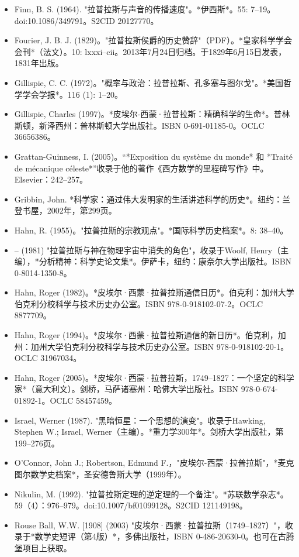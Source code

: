 \begin{itemize}
\item Finn, B. S. (1964). "拉普拉斯与声音的传播速度"。*伊西斯*。55: 7–19。doi:10.1086/349791。S2CID 20127770。  
\item Fourier, J. B. J. (1829)。"拉普拉斯侯爵的历史赞辞"（PDF）。*皇家科学学会会刊*（法文）。10: lxxxi–cii。2013年7月24日归档。于1829年6月15日发表，1831年出版。  
\item Gillispie, C. C. (1972)。"概率与政治：拉普拉斯、孔多塞与图尔戈"。*美国哲学学会学报*。116 (1): 1–20。  
\item Gillispie, Charles (1997)。*皮埃尔-西蒙·拉普拉斯：精确科学的生命*。普林斯顿，新泽西州：普林斯顿大学出版社。ISBN 0-691-01185-0。OCLC 36656386。  
\item Grattan-Guinness, I. (2005)。“*Exposition du système du monde* 和 *Traité de mécanique céleste*”收录于他的著作《西方数学的里程碑写作》中。Elsevier：242–257。  
\item Gribbin, John. *科学家：通过伟大发明家的生活讲述科学的历史*。纽约：兰登书屋，2002年，第299页。  
\item Hahn, R. (1955)。"拉普拉斯的宗教观点"。*国际科学历史档案*。8: 38–40。  
\item – (1981) "拉普拉斯与神在物理宇宙中消失的角色"，收录于Woolf, Henry（主编），*分析精神：科学史论文集*。伊萨卡，纽约：康奈尔大学出版社。ISBN 0-8014-1350-8。  
\item Hahn, Roger (1982)。*皮埃尔·西蒙·拉普拉斯通信日历*。伯克利：加州大学伯克利分校科学与技术历史办公室。ISBN 978-0-918102-07-2。OCLC 8877709。  
\item Hahn, Roger (1994)。*皮埃尔·西蒙·拉普拉斯通信的新日历*。伯克利，加州：加州大学伯克利分校科学与技术历史办公室。ISBN 978-0-918102-20-1。OCLC 31967034。  
\item Hahn, Roger (2005)。*皮埃尔·西蒙·拉普拉斯，1749–1827：一个坚定的科学家*（意大利文）。剑桥，马萨诸塞州：哈佛大学出版社。ISBN 978-0-674-01892-1。OCLC 58457459。
\item Israel, Werner (1987). "黑暗恒星：一个思想的演变"。收录于Hawking, Stephen W.; Israel, Werner（主编）。*重力学300年*。剑桥大学出版社，第199–276页。  
\item O'Connor, John J.; Robertson, Edmund F.，"皮埃尔-西蒙·拉普拉斯"，*麦克图尔数学史档案*，圣安德鲁斯大学（1999年）。  
\item Nikulin, M. (1992). "拉普拉斯定理的逆定理的一个备注"。*苏联数学杂志*。59（4）：976–979。doi:10.1007/bf01099128。S2CID 121149198。  
\item Rouse Ball, W.W. [1908] (2003) "皮埃尔·西蒙·拉普拉斯（1749–1827）"，收录于*数学史短评（第4版）*，多佛出版社，ISBN 0-486-20630-0。也可在古腾堡项目上获取。  

\end{itemize}
